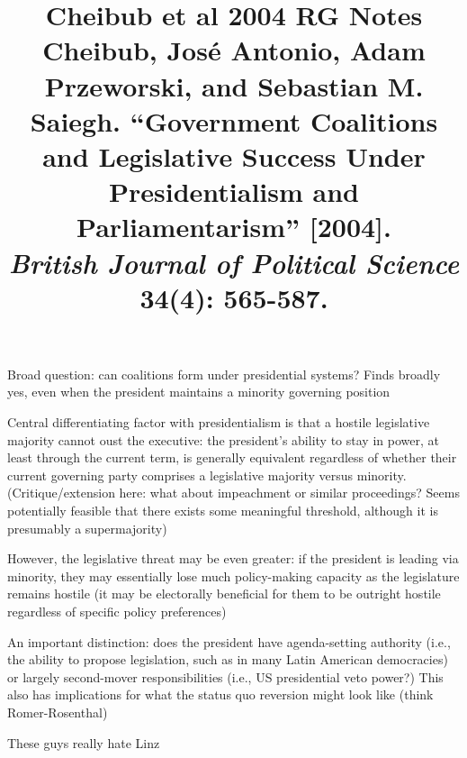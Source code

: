 \documentclass[12pt]{article}
\title{\textbf{Cheibub et al 2004 RG Notes}\\
\large Cheibub, José Antonio, Adam Przeworski, and Sebastian M. Saiegh. ``Government Coalitions and Legislative Success Under Presidentialism and Parliamentarism'' [2004].\\
\textit{British Journal of Political Science} 34(4): 565-587.}
\author{}
\date{}
\begin{document}
\maketitle

Broad question: can coalitions form under presidential systems? Finds broadly yes, even when the president maintains a minority governing position

Central differentiating factor with presidentialism is that a hostile legislative majority cannot oust the executive: the president's ability to stay in power, at least through the current term, is generally equivalent regardless of whether their current governing party comprises a legislative majority versus minority. (Critique/extension here: what about impeachment or similar proceedings? Seems potentially feasible that there exists some meaningful threshold, although it is presumably a supermajority)

However, the legislative threat may be even greater: if the president is leading via minority, they may essentially lose much policy-making capacity as the legislature remains hostile (it may be electorally beneficial for them to be outright hostile regardless of specific policy preferences)

An important distinction: does the president have agenda-setting authority (i.e., the ability to propose legislation, such as in many Latin American democracies) or largely second-mover responsibilities (i.e., US presidential veto power?) This also has implications for what the status quo reversion might look like (think Romer-Rosenthal)

These guys really hate Linz
\end{document}
